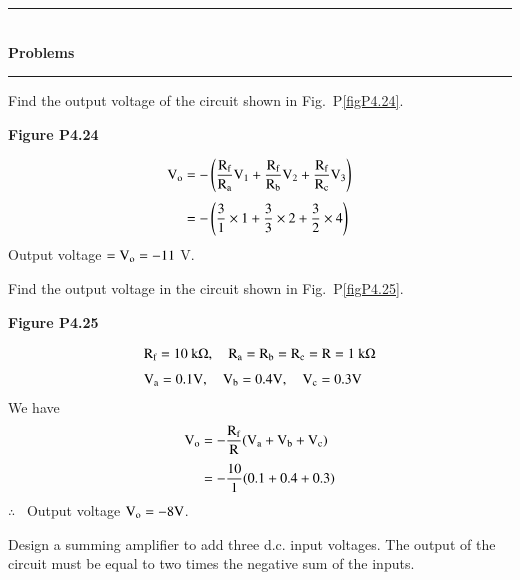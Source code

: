 \begin{center}
\rule{4cm}{1pt}\\
{\bf\Large Problems}\\[-3pt]
\rule{4cm}{1pt}
\end{center}

\begin{problem}\label{prob4.25}
Find the output voltage of the circuit shown in Fig.~P\ref{figP4.24}.
\begin{center}
{\bf Figure P4.24}
\end{center}
\end{problem}

\begin{solution}
\begin{align*}
\textrm{V}_{\textrm{o}} &= -\left(\frac{\textrm{R}_{\textrm{f}}}{\textrm{R}_{\textrm{a}}}\textrm{V}_{1}+\frac{\textrm{R}_{\textrm{f}}}{\textrm{R}_{\textrm{b}}}\textrm{V}_{2}+\frac{\textrm{R}_{\textrm{f}}}{\textrm{R}_{\textrm{c}}}\textrm{V}_{3}\right)\\[3pt]
&= - \left(\frac{3}{1}\times 1+\frac{3}{3}\times 2+\frac{3}{2}\times 4\right)
\end{align*}
Output voltage $=\textrm{V}_{\textrm{o}}=-11$ V.
\end{solution}

\begin{problem}\label{prob4.26}
Find the output voltage in the circuit shown in Fig.~P\eqref{figP4.25}.
\begin{center}
{\bf Figure P4.25}
\end{center}
\end{problem}

\begin{solution}
\begin{align*}
&\textrm{R}_{\textrm{f}}=10\text{~k}\Omega,\quad \textrm{R}_{\textrm{a}}=\textrm{R}_{\textrm{b}}=\textrm{R}_{\textrm{c}}=\textrm{R}=1~\textrm{k}\Omega\\[3pt]
&\textrm{V}_{\textrm{a}}=0.1\textrm{V},\quad \textrm{V}_{\textrm{b}}=0.4\textrm{V},\quad \textrm{V}_{\textrm{c}}=0.3\textrm{V}
\end{align*}
We have
\begin{align*}
\textrm{V}_{\textrm{o}} &= -\frac{\textrm{R}_{\textrm{f}}}{\textrm{R}}(\textrm{V}_{\textrm{a}}+\textrm{V}_{\textrm{b}}+\textrm{V}_{\textrm{c}})\\[3pt]
&= -\frac{10}{1}(0.1+0.4+0.3)
\end{align*}
$\therefore$~ Output voltage $\textrm{V}_{\textrm{o}}=-8\textrm{V}$.
\end{solution}

\begin{problem}\label{prob4.27}
Design a summing amplifier to add three d.c. input voltages. The output of the circuit must be equal to two times the negative sum of the inputs.
\end{problem}

